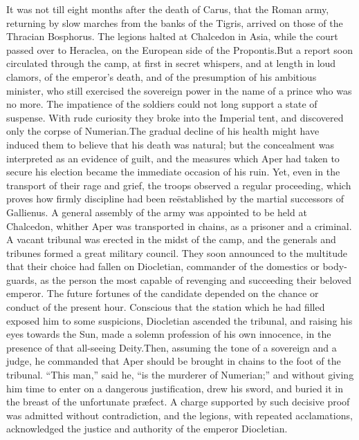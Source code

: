 It was not till eight months after the death of Carus, that the
Roman army, returning by slow marches from the banks of the
Tigris, arrived on those of the Thracian Bosphorus. The legions
halted at Chalcedon in Asia, while the court passed over to
Heraclea, on the European side of the Propontis.\footnotemark[104] But a report
soon circulated through the camp, at first in secret whispers,
and at length in loud clamors, of the emperor’s death, and of the
presumption of his ambitious minister, who still exercised the
sovereign power in the name of a prince who was no more. The
impatience of the soldiers could not long support a state of
suspense. With rude curiosity they broke into the Imperial tent,
and discovered only the corpse of Numerian.\footnotemark[105] The gradual
decline of his health might have induced them to believe that his
death was natural; but the concealment was interpreted as an
evidence of guilt, and the measures which Aper had taken to
secure his election became the immediate occasion of his ruin.
Yet, even in the transport of their rage and grief, the troops
observed a regular proceeding, which proves how firmly discipline
had been reëstablished by the martial successors of Gallienus. A
general assembly of the army was appointed to be held at
Chalcedon, whither Aper was transported in chains, as a prisoner
and a criminal. A vacant tribunal was erected in the midst of the
camp, and the generals and tribunes formed a great military
council. They soon announced to the multitude that their choice
had fallen on Diocletian, commander of the domestics or
body-guards, as the person the most capable of revenging and
succeeding their beloved emperor. The future fortunes of the
candidate depended on the chance or conduct of the present hour.
Conscious that the station which he had filled exposed him to
some suspicions, Diocletian ascended the tribunal, and raising
his eyes towards the Sun, made a solemn profession of his own
innocence, in the presence of that all-seeing Deity.\footnotemark[106] Then,
assuming the tone of a sovereign and a judge, he commanded that
Aper should be brought in chains to the foot of the tribunal.
“This man,” said he, “is the murderer of Numerian;” and without
giving him time to enter on a dangerous justification, drew his
sword, and buried it in the breast of the unfortunate præfect. A
charge supported by such decisive proof was admitted without
contradiction, and the legions, with repeated acclamations,
acknowledged the justice and authority of the emperor Diocletian.\footnotemark[107]

